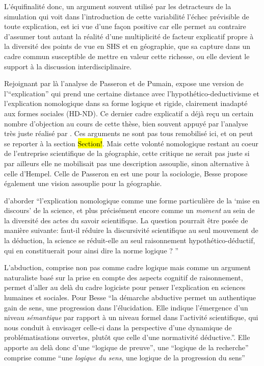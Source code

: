 L'équifinalité donc, un argument souvent utilisé par les detracteurs de la simulation qui voit dans l'introduction de cette variabilité l'échec prévisible de toute explication, est ici vue d'une façon positive car elle permet au contraire d'assumer tout autant la réalité d'une multiplicité de facteur explicatif propre à la diversité des points de vue en SHS et en géographie, que sa capture dans un cadre commun susceptible de mettre en valeur cette richesse, ou elle devient le support à la discussion interdisciplinaire. 

Rejoignant par là l'analyse de Passeron et de Pumain, \textcite{Besse2000} expose une version de l'\enquote{explication} qui prend une certaine distance avec l'hypothético-deductivisme et l'explication nomologique dans sa forme logique et rigide, clairement inadapté aux formes sociales (HD-ND). Ce dernier cadre explicatif a déjà reçu un certain nombre d'objection au cours de cette thèse, bien souvent appuyé par l'analyse très juste réalisé par \textcite{Besse2000}. Ces arguments ne sont pas tous remobilisé ici, et on peut se reporter à la section \hl{Section!}. Mais cette volonté nomologique restant au coeur de l'entreprise scientifique de la géographie, cette critique ne serait pas juste si par ailleurs elle ne mobilisait pas une description assouplie, sinon alternative à celle d'Hempel. Celle de Passeron en est une pour la sociologie, Besse propose également une vision assouplie pour la géographie.

\textcite{Besse2000} d'aborder \enquote{l'explication nomologique comme une forme particulière de la \enquote{mise en discours} de la science, et plus précisément encore comme un \textit{moment} au sein de la diversité des actes du savoir scientifique. La question pourrait être posée de manière suivante: faut-il réduire la discursivité scientifique au seul mouvement de la déduction, la science se réduit-elle au seul raisonnement hypothético-déductif, qui en constituerait pour ainsi dire la norme logique ? }
 
L'abduction, comprise non pas comme cadre logique mais comme un argument naturaliste basé sur la prise en compte des aspects cognitif de raisonnement, permet d'aller au delà du cadre logiciste pour penser l'explication en sciences humaines et sociales. Pour Besse \enquote{la démarche abductive permet un authentique gain de sens, une progression dans l'élucidation. Elle indique l'émergence d'un niveau \textit{sémantique} par rapport à un niveau formel dans l'activité scientifique, qui nous conduit à envisager celle-ci dans la perspective d'une dynamique de problématisations ouvertes, plutôt que celle d'une normativité déductive.}. Elle apporte au delà donc d'une \enquote{logique de preuve}, une \enquote{logique de la recherche} comprise comme \enquote{une \textit{logique du sens}, une logique de la progression du sens}

